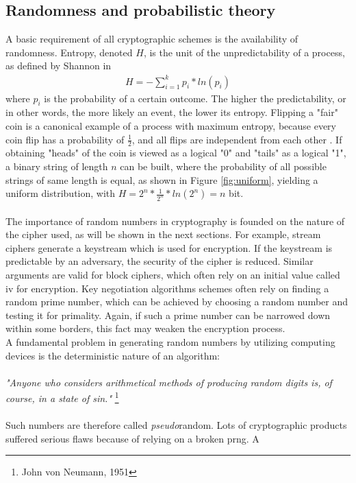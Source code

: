 \subsection{Randomness and probabilistic theory}
A basic requirement of all cryptographic schemes is the availability of randomness. Entropy, denoted $H$, is the unit of the unpredictability of a process, as
 defined by Shannon in \cite{6773024}
 \begin{align}
 H = - \sum_{i=1}^{k} p_i* ln(p_i)
\end{align}
where $p_i$ is the probability of a certain outcome.
The higher the predictability, or in other words, the more likely an event, the lower its entropy. Flipping a "fair" coin is a canonical 
example of a process with maximum entropy, because every coin flip has a probability of $\frac{1}{2}$, and all flips are independent from each other \cite{1621063}.
If obtaining "heads" of the coin is viewed as a logical "0" and "tails" as a logical "1", a binary string of length $n$ can be built, where the probability of all possible
strings of same length is equal, as shown in Figure \ref{fig:uniform}, yielding a uniform distribution, with
$H = 2^n*\frac{1}{2^n}*ln(2^n) = n$ bit. 
\\
\\
The importance of random numbers in cryptography is founded on the nature of the cipher used, as will be shown in the next sections. For example,
stream ciphers generate a keystream which is used
for encryption. If the keystream is predictable by an adversary, the security of the cipher is reduced. Similar arguments are valid for block ciphers, which often
rely on an initial value called \gls{iv} for encryption. Key negotiation algorithms schemes often rely on finding a random prime number, which can be 
achieved by choosing a random number and testing it for primality. Again, if such a prime number can be narrowed down within some borders, this fact may
weaken the encryption process.
\\
A fundamental problem in generating random numbers by utilizing computing devices is the deterministic nature of an algorithm:
\\
\\
\textit{"Anyone who considers arithmetical methods of producing random digits is, of course, in a state of sin."} \footnote{John von Neumann, 1951}
\\
\\
Such numbers are therefore called \textit{pseudo}random. Lots of cryptographic products suffered serious flaws because of relying on a broken \gls{prng}. A 
